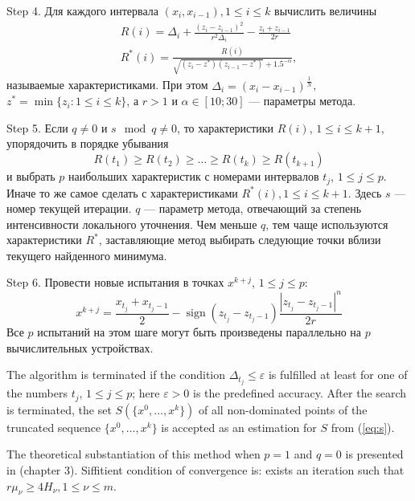 \documentclass{llncs}
\DeclareMathOperator{\sign}{sign}
\begin{document}
Step 4. Для каждого интервала \((x_i,x_{i-1}),1\leqslant i\leqslant k\) вычислить величины
\begin{eqnarray}
  R(i) = \Delta_i + \frac{(z_i-z_{i-1})^2}{r^2\Delta_i}-\frac{z_i+z_{i-1}}{2r} \\
  R^*(i)=\frac{R(i)}{\sqrt{(z_i-z^*)(z_{i-1}-z^*)} + 1.5^{-\alpha}},
\end{eqnarray}
называемые характеристиками. При этом \(\Delta_i=(x_i-x_{i-1})^\frac{1}{N}\), \(z^*=\min\{z_i:1\leqslant i\leqslant k\}\), а \(r>1\) и \(\alpha\in [10;30]\) --- параметры метода.

Step 5. Если \(q\not=0\) и \(s \mod q\not=0 \), то характеристики \(R(i)\), \(1 \leqslant i \leqslant k + 1\), упорядочить в порядке убывания
\begin{equation*}
  R(t_1) \geqslant R(t_2) \geqslant \dots \geqslant R(t_k) \geqslant R(t_{k+1})
\end{equation*}
и выбрать \(p\) наибольших характеристик с номерами интервалов \(t_j\), \(1 \leqslant j \leqslant p\). Иначе то же самое сделать с характеристиками \(R^*(i),1\leqslant i\leqslant k+1\). Здесь \(s\) --- номер текущей итерации. \(q\) --- параметр метода, отвечающий за степень интенсивности локального уточнения. Чем меньше \(q\), тем чаще используются характеристики \(R^*\), заставляющие метод выбирать следующие точки вблизи текущего найденного минимума.

Step 6. Провести новые испытания в точках \(x^{k+j}\), \(1 \leqslant j \leqslant p\):
\begin{equation}
  x^{k+j}=\frac{x_{t_j}+x_{t_j-1}}{2} - \sign(z_{t_j} - z_{t_j-1})\frac{|z_{t_j} - z_{t_j-1}|^n}{2r}
\end{equation}
Все \(p\) испытаний на этом шаге могут быть произведены параллельно на \(p\) вычислительных устройствах.

The algorithm is terminated if the condition \(\Delta_{t_j}\leqslant \varepsilon\) is fulfilled at least for one of the numbers \(t_j\), \(1\leqslant j\leqslant p\); here \(\varepsilon >0\) is the predefined accuracy.
After the search is terminated, the set \(S(\{x^0,\dots ,x^k\})\) of all
non-dominated points of the truncated sequence \(\{x^0,\dots ,x^k\}\) is accepted as an estimation for \(S\) from (\ref{eq:s}).

The theoretical substantiation of this method when \(p=1\) and \(q=0\) is presented in \cite{strOptBook}(chapter 3). Siffitient condition of convergence is: exists an iteration such that \(r\mu_\nu \geqslant 4H_\nu,1\leqslant \nu \leqslant m\).
\end{document}
